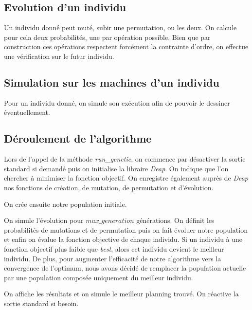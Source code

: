\newpage

\subsection{Evolution d'un individu}



Un individu donné peut muté, subir une permutation, ou les deux. On calcule pour cela deux probabilités, une par opération possible. Bien que par construction ces opérations respectent forcément la contrainte d'ordre, on effectue une vérification sur le futur individu.

\subsection{Simulation sur les machines d'un individu}



Pour un individu donné, on simule son exécution afin de pouvoir le dessiner éventuellement.

\subsection{Déroulement de l'algorithme}



Lors de l'appel de la méthode \textit{run\_genetic}, on commence par désactiver la sortie standard si demandé puis on initialise la libraire \textit{Deap}. On indique que l'on chercher à minimiser la fonction objectif. On enregistre également auprès de \textit{Deap} nos fonctions de création, de mutation, de permutation et d'évolution.



On crée ensuite notre population initiale.



On simule l'évolution pour $max\_generation$ générations. On définit les probabilités de mutations et de permutation puis on fait évoluer notre population et enfin on évalue la fonction objective de chaque individu. Si un individu à une fonction objectif plus faible que \textit{best}, alors cet individu devient le meilleur individu. De plus, pour augmenter l'efficacité de notre algorithme vers la convergence de l'optimum, nous avons décidé de remplacer la population actuelle par une population composée uniquement du meilleur individu.

\newpage



On affiche les résultats et on simule le meilleur planning trouvé. On réactive la sortie standard si besoin.